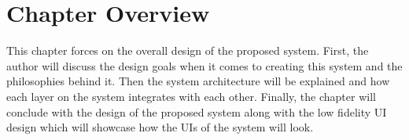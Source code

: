\section{Chapter Overview}

This chapter forces on the overall design of the proposed system. First, the author will discuss the design goals when it comes to creating this system and the philosophies behind it. Then the system architecture will be explained and how each layer on the system integrates with each other. Finally, the chapter will conclude with the design of the proposed system along with the low fidelity UI design which will showcase how the UIs of the system will look. 